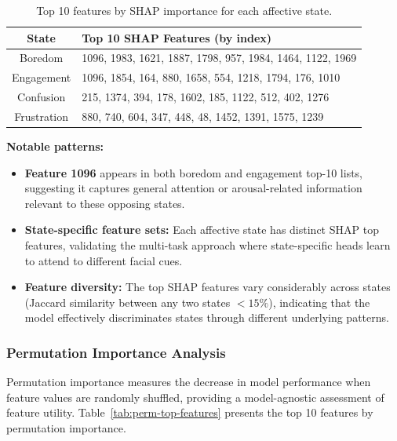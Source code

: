 \begin{table}[t]
\centering
\caption{Top 10 features by SHAP importance for each affective state.}
\label{tab:shap-top-features}
\begin{tabular}{cl}
\toprule
\textbf{State} & \textbf{Top 10 SHAP Features (by index)} \\
\midrule
Boredom & 1096, 1983, 1621, 1887, 1798, 957, 1984, 1464, 1122, 1969 \\
Engagement & 1096, 1854, 164, 880, 1658, 554, 1218, 1794, 176, 1010 \\
Confusion & 215, 1374, 394, 178, 1602, 185, 1122, 512, 402, 1276 \\
Frustration & 880, 740, 604, 347, 448, 48, 1452, 1391, 1575, 1239 \\
\bottomrule
\end{tabular}
\end{table}

\textbf{Notable patterns:}
\begin{itemize}
    \item \textbf{Feature 1096} appears in both boredom and engagement top-10 lists, suggesting it captures general attention or arousal-related information relevant to these opposing states.

    \item \textbf{State-specific feature sets:} Each affective state has distinct SHAP top features, validating the multi-task approach where state-specific heads learn to attend to different facial cues.

    \item \textbf{Feature diversity:} The top SHAP features vary considerably across states (Jaccard similarity between any two states $<15\%$), indicating that the model effectively discriminates states through different underlying patterns.
\end{itemize}

\subsubsection{Permutation Importance Analysis}
\label{sec:permutation-importance}

Permutation importance measures the decrease in model performance when feature values are randomly shuffled, providing a model-agnostic assessment of feature utility. Table~\ref{tab:perm-top-features} presents the top 10 features by permutation importance.


